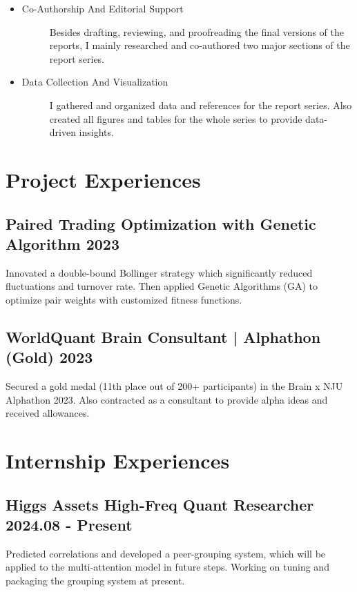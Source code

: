 \documentclass[a4paper]{article}
\begin{document}
\begin{itemize}
    \item \begin{description}
        \item[Co-Authorship And Editorial Support] Besides drafting, reviewing, and proofreading the final versions of the reports, I mainly researched and co-authored two major sections of the report series.
    \end{description}
    \item \begin{description}
        \item[Data Collection And Visualization] I gathered and organized data and references for the report series. Also created all figures and tables for the whole series to provide data-driven insights. 
    \end{description} 
\end{itemize}

\newpage
\hspace{2cm}

\section{Project Experiences} %
\subsection{Paired Trading Optimization with Genetic Algorithm \normalfont \hfill 2023}
Innovated a double-bound Bollinger strategy which significantly reduced fluctuations and turnover rate. Then applied Genetic Algorithms (GA) to optimize pair weights with customized fitness functions.

\subsection{WorldQuant Brain Consultant | Alphathon (Gold) \normalfont  \hfill 2023}
Secured a gold medal (11th place out of 200+ participants) in the Brain x NJU Alphathon 2023. Also contracted as a consultant to provide alpha ideas and received allowances.

\section{Internship Experiences} %
\subsection{Higgs Assets \normalfont \hfill High-Freq Quant Researcher \hfill 2024.08 - Present}
Predicted correlations and developed a peer-grouping system, which will be applied to the multi-attention model in future steps. Working on tuning and packaging the grouping system at present.
\end{document}
